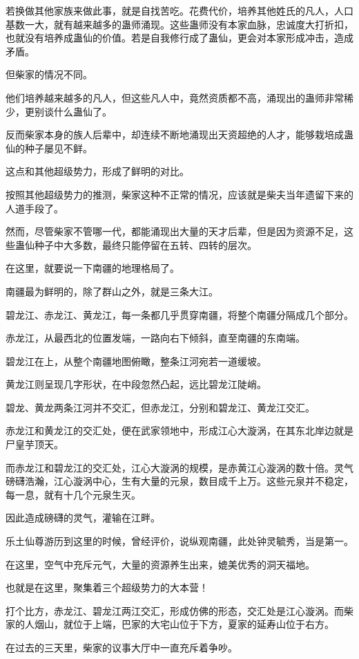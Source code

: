 \begin{this_body}
若换做其他家族来做此事，就是自找苦吃。花费代价，培养其他姓氏的凡人，人口基数一大，就有越来越多的蛊师涌现。这些蛊师没有本家血脉，忠诚度大打折扣，也就没有培养成蛊仙的价值。若是自我修行成了蛊仙，更会对本家形成冲击，造成矛盾。

但柴家的情况不同。

他们培养越来越多的凡人，但这些凡人中，竟然资质都不高，涌现出的蛊师非常稀少，更别谈什么蛊仙了。

反而柴家本身的族人后辈中，却连续不断地涌现出天资超绝的人才，能够栽培成蛊仙的种子屡见不鲜。

这点和其他超级势力，形成了鲜明的对比。

按照其他超级势力的推测，柴家这种不正常的情况，应该就是柴夫当年遗留下来的人道手段了。

然而，尽管柴家不管哪一代，都能涌现出大量的天才后辈，但是因为资源不足，这些蛊仙种子中大多数，最终只能停留在五转、四转的层次。

在这里，就要说一下南疆的地理格局了。

南疆最为鲜明的，除了群山之外，就是三条大江。

碧龙江、赤龙江、黄龙江，每一条都几乎贯穿南疆，将整个南疆分隔成几个部分。

赤龙江，从最西北的位置发端，一路向右下倾斜，直至南疆的东南端。

碧龙江在上，从整个南疆地图俯瞰，整条江河宛若一道缓坡。

黄龙江则呈现几字形状，在中段忽然凸起，远比碧龙江陡峭。

碧龙、黄龙两条江河并不交汇，但赤龙江，分别和碧龙江、黄龙江交汇。

赤龙江和黄龙江的交汇处，便在武家领地中，形成江心大漩涡，在其东北岸边就是尸皇芋顶天。

而赤龙江和碧龙江的交汇处，江心大漩涡的规模，是赤黄江心漩涡的数十倍。灵气磅礴浩瀚，江心漩涡中心，生有大量的元泉，数目成千上万。这些元泉并不稳定，每一息，就有十几个元泉生灭。

因此造成磅礴的灵气，灌输在江畔。

乐土仙尊游历到这里的时候，曾经评价，说纵观南疆，此处钟灵毓秀，当是第一。

在这里，空气中充斥元气，大量的资源养生出来，媲美优秀的洞天福地。

也就是在这里，聚集着三个超级势力的大本营！

打个比方，赤龙江、碧龙江两江交汇，形成仿佛的形态，交汇处是江心漩涡。而柴家的人烟山，就位于上端，巴家的大宅山位于下方，夏家的延寿山位于右方。

在过去的三天里，柴家的议事大厅中一直充斥着争吵。


\end{this_body}
